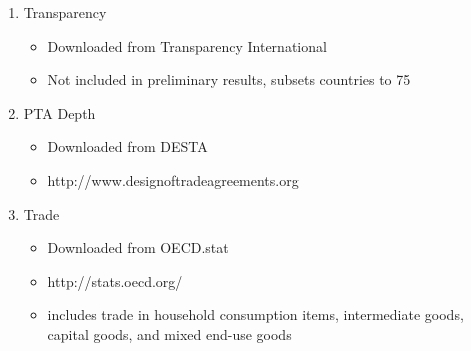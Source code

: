 \documentclass{article}
\begin{document}
\begin{enumerate}
\begin{itemize}
		\end{itemize}
	\item {Transparency}
		\begin{itemize}
			\item{Downloaded from Transparency International}
			\item{Not included in preliminary results, subsets countries to 75}
		\end{itemize}
	\item {PTA Depth}
		\begin{itemize}
			\item{Downloaded from DESTA}
			\item{http://www.designoftradeagreements.org}
		\end{itemize}
	\item {Trade}
		\begin{itemize}
			\item{Downloaded from OECD.stat}
			\item{http://stats.oecd.org/}
			\item{includes trade in household consumption items, intermediate goods, capital goods, and mixed end-use goods}
		\end{itemize}
		
\end{enumerate}
\end{document}
